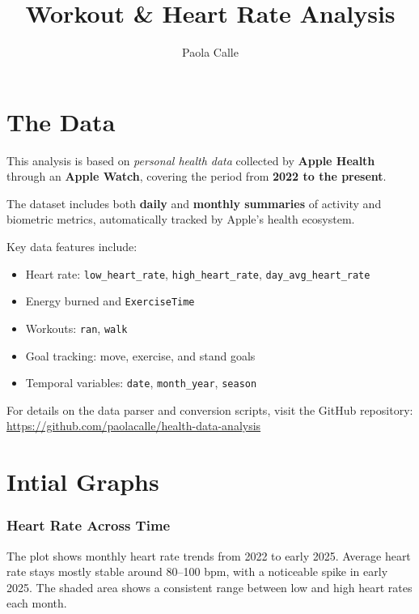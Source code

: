 \documentclass[
  11pt,
]{article}
\title{Workout \& Heart Rate Analysis}
\author{Paola Calle}
\date{}
\providecommand{\tightlist}{%
  \setlength{\itemsep}{0pt}\setlength{\parskip}{0pt}}
\begin{document}
\maketitle

{
\setcounter{tocdepth}{2}
\tableofcontents
}
\section{The Data}\label{the-data}

This analysis is based on \emph{personal health data} collected by
\textbf{Apple Health} through an \textbf{Apple Watch}, covering the
period from \textbf{2022 to the present}.

The dataset includes both \textbf{daily} and \textbf{monthly summaries}
of activity and biometric metrics, automatically tracked by Apple's
health ecosystem.

Key data features include:

\begin{itemize}
\tightlist
\item
  Heart rate: \texttt{low\_heart\_rate}, \texttt{high\_heart\_rate},
  \texttt{day\_avg\_heart\_rate}
\item
  Energy burned and \texttt{ExerciseTime}
\item
  Workouts: \texttt{ran}, \texttt{walk}
\item
  Goal tracking: move, exercise, and stand goals
\item
  Temporal variables: \texttt{date}, \texttt{month\_year},
  \texttt{season}
\end{itemize}

For details on the data parser and conversion scripts, visit the GitHub
repository:\\
\url{https://github.com/paolacalle/health-data-analysis}

\section{Intial Graphs}\label{intial-graphs}

\subsubsection{Heart Rate Across Time}\label{heart-rate-across-time}

The plot shows monthly heart rate trends from 2022 to early 2025.
Average heart rate stays mostly stable around 80--100 bpm, with a
noticeable spike in early 2025. The shaded area shows a consistent range
between low and high heart rates each month.
\end{document}
